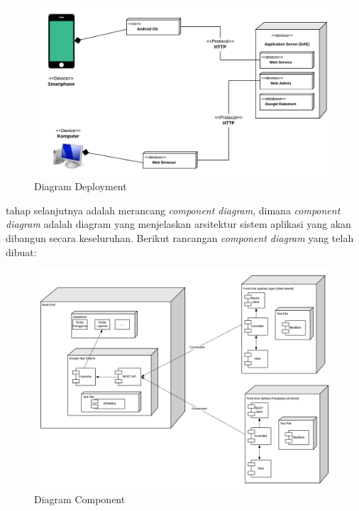 		\vspace{-0.4cm}
	\begin{figure}[H]
		\center
		\includegraphics [width = 14cm]{gambar/model/deployment}
		\caption{Diagram Deployment}
		\label{deployment}
	\end{figure}

	\par tahap selanjutnya adalah merancang \textit{component diagram}, dimana \textit{component diagram} adalah diagram yang menjelaskan arsitektur sistem aplikasi yang akan dibangun secara keseluruhan. Berikut rancangan \textit{component diagram} yang telah dibuat:
	
	\vspace{-0.4cm}
	\begin{figure}[H]
		\center
		\includegraphics [width = 14cm]{gambar/model/component}
		\caption{Diagram Component}
		\label{component}
	\end{figure}

